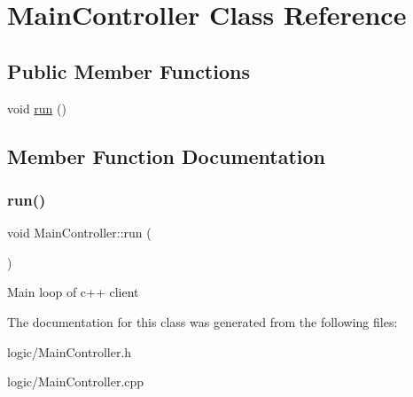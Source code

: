 \hypertarget{classMainController}{}\section{Main\+Controller Class Reference}
\label{classMainController}
\subsection*{Public Member Functions}
\begin{DoxyCompactItemize}
\item 
void \hyperlink{classMainController_a2dc81550fb4ac999e6c1827518fa0830}{run} ()
\end{DoxyCompactItemize}


\subsection{Member Function Documentation}
\mbox{\label{classMainController_a2dc81550fb4ac999e6c1827518fa0830}} 
\subsubsection{\texorpdfstring{run()}{run()}}
{\footnotesize\ttfamily void Main\+Controller\+::run (\begin{DoxyParamCaption}{ }\end{DoxyParamCaption})}

Main loop of c++ client 

The documentation for this class was generated from the following files\+:\begin{DoxyCompactItemize}
\item 
logic/Main\+Controller.\+h\item 
logic/Main\+Controller.\+cpp\end{DoxyCompactItemize}
